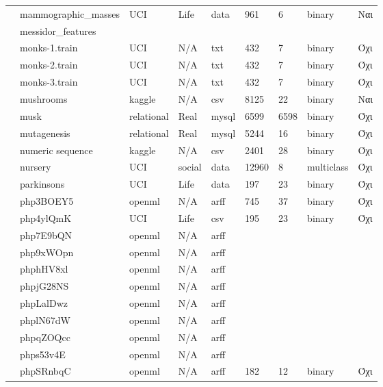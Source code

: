 \begin{longtable}{| p{} | p{}| p{} | p{} | p{} | p{} | p{} | p{} | p{} | }
 			\rownumber & mammographic\_masses & UCI & Life & data & 961 & 6 & binary & Ναι \\
 			\rownumber & messidor\_features & & & & & & & \\
 			\rownumber & monks-1.train \citep{monks} & UCI & N/A & txt & 432 & 7 & binary & Όχι \\
 			\rownumber & monks-2.train \citep{monks} & UCI & N/A & txt & 432 & 7 & binary & Όχι \\
 			\rownumber & monks-3.train \citep{monks}& UCI & N/A & txt & 432 & 7 & binary & Όχι \\
 			\rownumber & mushrooms \citep{mushroom} & kaggle & N/A & csv & 8125 & 22 & binary & Ναι \\
 			\rownumber & musk \citep{musk} & relational & Real & mysql & 6599
 			  & 6598 & binary & Όχι \\
 			\rownumber & mutagenesis \citep{Mutagenesis} & relational & Real & mysql & 5244 & 16 & binary & Όχι \\
 			\rownumber & numeric sequence \citep{sequence} & kaggle & N/A & csv & 2401 & 28 & binary & Όχι \\
 			\rownumber & nursery \citep{nursery} & UCI & social & data & 12960 & 8 & multiclass & Όχι \\
 			\rownumber & parkinsons \citep{parkinsons} & UCI & Life & data & 197 & 23 & binary & Όχι \\
 			\rownumber & php3BOEY5 \citep{pie} & openml & N/A & arff & 745  & 37  &  binary& Όχι \\
 			\rownumber & php4ylQmK \citep{thyroid} & UCI & Life & csv & 195 & 23 & binary & Όχι \\
 			\rownumber & php7E9bQN & openml & N/A & arff & & & & \\
 			\rownumber & php9xWOpn & openml & N/A & arff & & & & \\
 			\rownumber & phphHV8xl & openml & N/A & arff & & & & \\
 			\rownumber & phpjG28NS & openml & N/A & arff & & & & \\
 			\rownumber & phpLalDwz & openml & N/A & arff & & & & \\
 			\rownumber & phplN67dW & openml & N/A & arff & & & & \\
 			\rownumber & phpqZOQcc & openml & N/A & arff & & & & \\
 			\rownumber & phps53v4E & openml & N/A & arff & & & & \\
 			\rownumber & phpSRnbqC \citep{planning} & openml & N/A & arff & 182 & 12 & binary & Όχι \\

\end{longtable}
